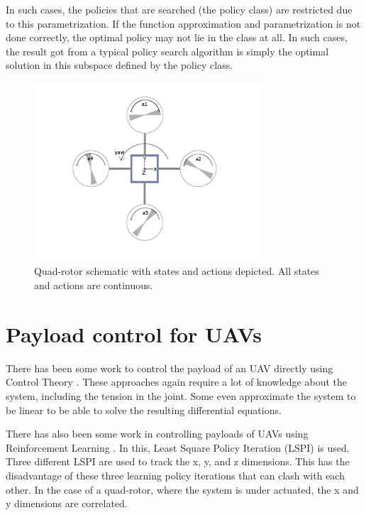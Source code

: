\documentclass[hidelinks,BTech]{iitmdiss}
\begin{document}
In such cases, the policies that are searched (the policy class) are restricted due to this parametrization. If the function approximation and parametrization is not done correctly, the optimal policy may not lie in the class at all. In such cases, the result got from a typical policy search algorithm is simply the optimal solution in this subspace defined by the policy class.

\begin{figure}[H]
  \centering
    \includegraphics[width=0.75\textwidth]{quadrotor_states_actions.png}
    \caption{Quad-rotor schematic with states and actions depicted. All states and actions are continuous.}
\end{figure}

\section{Payload control for UAVs}

There has been some work to control the payload of an UAV directly using Control Theory \cite{PayloadControlTheory,PayloadControlTheory2}. These approaches again require a lot of knowledge about the system, including the tension in the joint. Some even approximate the system to be linear to be able to solve the resulting differential equations.

There has also been some work in controlling payloads of UAVs using Reinforcement Learning \cite{PayloadLSPI}. In this, Least Square Policy Iteration (LSPI) is used. Three different LSPI are used to track the x, y, and z dimensions. This has the disadvantage of these three learning policy iterations that can clash with each other. In the case of a quad-rotor, where the system is under actuated, the x and y dimensions are correlated.
\end{document}

